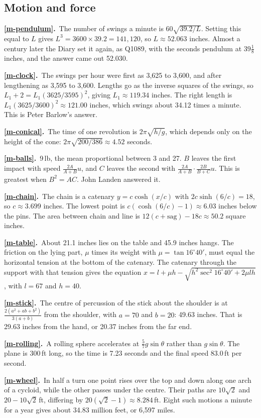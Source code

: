 \documentclass[11pt,a4paper]{article}
\newcommand{\ans}[2]{\par\smallskip\noindent\textbf{\ref{#1}.}\ #2}
\begin{document}
\subsection*{Motion and force}
\ans{m-pendulum}{The number of swings a minute is $60\sqrt{39.2/L}$. Setting this equal to
$L$ gives $L^3 = 3600\times39.2 = 141{,}120$, so $L \approx 52.063$ inches. Almost a
century later the Diary set it again, as Q1089, with the seconds pendulum at
$39\tfrac18$ inches, and the answer came out 52.030.}
\ans{m-clock}{The swings per hour were first as 3,625 to 3,600, and after lengthening as
3,595 to 3,600. Lengths go as the inverse squares of the swings, so $L_1 + 2 =
L_1(3625/3595)^2$, giving $L_1\approx119.34$ inches. The right length is
$L_1(3625/3600)^2\approx121.00$ inches, which swings about 34.12 times a minute. This is
Peter Barlow's answer.}
\ans{m-conical}{The time of one revolution is $2\pi\sqrt{h/g}$, which depends only on the
height of the cone: $2\pi\sqrt{200/386}\approx4.52$ seconds.}
\ans{m-balls}{9\,lb, the mean proportional between 3 and 27. $B$ leaves the first impact
with speed $\tfrac{2A}{A+B}u$, and $C$ leaves the second with
$\tfrac{2A}{A+B}\cdot\tfrac{2B}{B+C}u$. This is greatest when $B^2 = AC$. John Landen
answered it.}
\ans{m-chain}{The chain is a catenary $y = c\cosh(x/c)$ with $2c\sinh(6/c) = 18$, so
$c\approx3.699$ inches. The lowest point is $c(\cosh(6/c)-1)\approx6.03$ inches below the
pins. The area between chain and line is $12(c + \text{sag}) - 18c \approx 50.2$ square
inches.}
\ans{m-table}{About 21.1 inches lies on the table and 45.9 inches hangs. The friction on
the lying part, $\mu$ times its weight with $\mu = \tan16^\circ40'$, must equal the
horizontal tension at the bottom of the catenary. The catenary through the support with
that tension gives the equation
$x = l + \mu h - \sqrt{h^2\sec^2 16^\circ40' + 2\mu lh}$, with $l = 67$ and
$h = 40$.}
\ans{m-stick}{The centre of percussion of the stick about the shoulder is at
$\tfrac{2(a^2+ab+b^2)}{3(a+b)}$ from the shoulder, with $a = 70$ and $b = 20$: 49.63 inches.
That is 29.63 inches from the hand, or 20.37 inches from the far end.}
\ans{m-rolling}{A rolling sphere accelerates at $\tfrac57g\sin\theta$ rather than
$g\sin\theta$. The plane is 300\,ft long, so the time is 7.23 seconds and the final speed
83.0\,ft per second.}
\ans{m-wheel}{In half a turn one point rises over the top and down along one arch of a
cycloid, while the other passes under the centre. Their paths are $10\sqrt2$ and
$20 - 10\sqrt2$\,ft, differing by $20(\sqrt2-1)\approx8.284$\,ft. Eight such motions a
minute for a year gives about 34.83 million feet, or 6,597 miles.}
\end{document}
